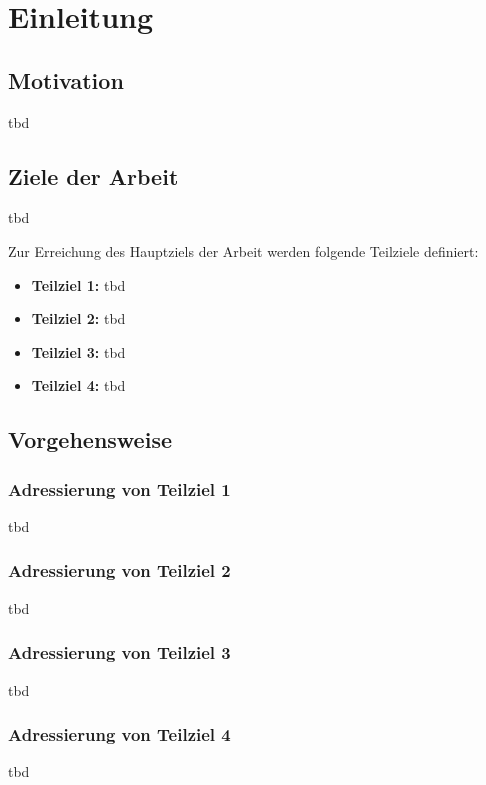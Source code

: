 %
%
%
\chapter{Einleitung}
\label{chap:intro}

%
%
%
\section{Motivation}
tbd

%
%
%
\section{Ziele der Arbeit}
tbd

Zur Erreichung des Hauptziels der Arbeit werden folgende Teilziele definiert:

\begin{itemize}
   \item \textbf{Teilziel 1:} tbd  
   \item \textbf{Teilziel 2:} tbd  
   \item \textbf{Teilziel 3:} tbd  
   \item \textbf{Teilziel 4:} tbd  
\end{itemize}


%
%
%
\section{Vorgehensweise}
\subsection*{Adressierung von Teilziel 1}
tbd

\subsection*{Adressierung von Teilziel 2}
tbd

\subsection*{Adressierung von Teilziel 3}
tbd

\subsection*{Adressierung von Teilziel 4}
tbd